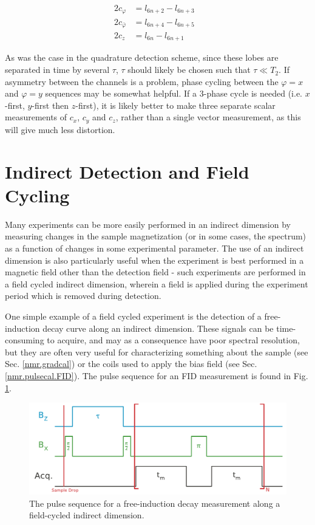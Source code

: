 \documentclass[PaulGanssle-Thesis.tex]{subfiles}
\begin{document}
\begin{equation}
\label{eqn:VectorSequenceLobes}
\begin{aligned}
 2c_{\varphi} &= l_{6n+2}-l_{6n+3} & \\
 2c_{\bar{\varphi}} &= l_{6n+4}-l_{6n+5} & \\
 2c_{z} &= l_{6n}-l_{6n+1} &
\end{aligned}
\end{equation}

As was the case in the quadrature detection scheme, since these lobes are separated in time by several $\tau$, $\tau$ should likely be chosen such that $\tau \ll T_{2}$. If asymmetry between the channels is a problem, phase cycling between the $\varphi=x$ and $\varphi=y$ sequences may be somewhat helpful. If a 3-phase cycle is needed (i.e. $x$-first, $y$-first then $z$-first), it is likely better to make three separate scalar measurements of $c_{x}$, $c_{y}$ and $c_{z}$, rather than a single vector measurement, as this will give much less distortion.

\section{Indirect Detection and Field Cycling}
\label{nmr.indirect}
Many experiments can be more easily performed in an indirect dimension by measuring changes in the sample magnetization (or in some cases, the spectrum) as a function of changes in some experimental parameter. The use of an indirect dimension is also particularly useful when the experiment is best performed in a magnetic field other than the detection field - such experiments are performed in a field cycled indirect dimension, wherein a field is applied during the experiment period which is removed during detection.

One simple example of a field cycled experiment is the detection of a free-induction decay curve along an indirect dimension. These signals can be time-consuming to acquire, and may as a consequence have poor spectral resolution, but they are often very useful for characterizing something about the sample (see Sec. \ref{nmr.gradcal}) or the coils used to apply the bias field (see Sec. \ref{nmr.pulsecal.FID}). The pulse sequence for an FID measurement is found in Fig. \ref{fig:FIDIndirectPulseSequence}.

\begin{figure}[ht!]
\includegraphics[width=0.95\tw]{figures/relaxometry/fid_acq_sequence_diagram.pdf}
\caption{The pulse sequence for a free-induction decay measurement along a field-cycled indirect dimension.}
\label{fig:FIDIndirectPulseSequence}
\end{figure}
\end{document}
